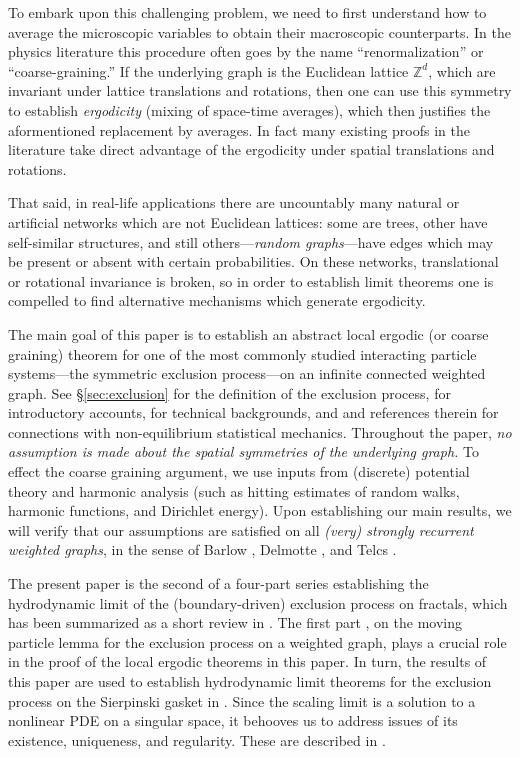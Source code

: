 \documentclass[11pt]{amsart}
\theoremstyle{plain}
\theoremstyle{definition}
\theoremstyle{remark}
\begin{document}
To embark upon this challenging problem, we need to first understand how to average the microscopic variables to obtain their macroscopic counterparts. In the physics literature this procedure often goes by the name ``renormalization'' or ``coarse-graining.'' If the underlying graph is the Euclidean lattice $\mathbb{Z}^d$, which are invariant under lattice translations and rotations, then one can use this symmetry to establish \emph{ergodicity} (mixing of space-time averages), which then justifies the aformentioned replacement by averages. In fact many existing proofs in the literature take direct advantage of the ergodicity under spatial translations and rotations.

That said, in real-life applications there are uncountably many natural or artificial networks which are not Euclidean lattices: some are trees, other have self-similar structures, and still others---\emph{random graphs}---have edges which may be present or absent with certain probabilities. On these networks, translational or rotational invariance is broken, so in order to establish limit theorems one is compelled to find alternative mechanisms which generate ergodicity.


The main goal of this paper is to establish an abstract local ergodic (or coarse graining) theorem for one of the most commonly studied interacting particle systems---the symmetric exclusion process---on an infinite connected weighted graph. See \S\ref{sec:exclusion} for the definition of the exclusion process, \cite{AldousFill, Spitzer, IPSStFlour} for introductory accounts, \cite{KipnisLandim, LiggettBook, Spohn} for technical backgrounds, and \cite{ABDS13, BDGJL15} and references therein for connections with non-equilibrium statistical mechanics. Throughout the paper, \emph{no assumption is made about the spatial symmetries of the underlying graph.} To effect the coarse graining argument, we use inputs from (discrete) potential theory and harmonic analysis (such as hitting estimates of random walks, harmonic functions, and Dirichlet energy). Upon establishing our main results, we will verify that our assumptions are satisfied on all \emph{(very) strongly recurrent weighted graphs}, in the sense of Barlow \cite{BarlowValues, BCK05}, Delmotte \cite{Delmotte}, and Telcs \cites{Telcs01, Telcs01_2}.

The present paper is the second of a four-part series establishing the hydrodynamic limit of the (boundary-driven) exclusion process on fractals, which has been summarized as a short review in \cite{SSEPreview}. The first part \cite{ChenMPL}, on the moving particle lemma for the exclusion process on a weighted graph, plays a crucial role in the proof of the local ergodic theorems in this paper. In turn, the results of this paper are used to establish hydrodynamic limit theorems for the exclusion process on the Sierpinski gasket in \cite{ChenTeplyaevSGHydro}. Since the scaling limit is a solution to a nonlinear PDE on a singular space, it behooves us to address issues of its existence, uniqueness, and regularity. These are described in \cite{CHTPDE}.
\end{document}
